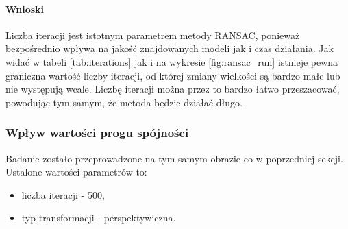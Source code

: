 \documentclass{article}
\begin{document}
	\paragraph{Wnioski}
	Liczba iteracji jest istotnym parametrem metody RANSAC, ponieważ bezpośrednio wpływa na jakość znajdowanych modeli jak i czas działania. Jak widać w tabeli \ref{tab:iterations} jak i na wykresie \ref{fig:ransac_run} istnieje pewna graniczna wartość liczby iteracji, od której zmiany wielkości są bardzo małe lub nie występują wcale. Liczbę iteracji można przez to bardzo łatwo przeszacować, powodując tym samym, że metoda będzie działać długo.

	\subsubsection{Wpływ wartości progu spójności}
	Badanie zostało przeprowadzone na tym samym obrazie co w poprzedniej sekcji. Ustalone wartości parametrów to:
	\begin{itemize}
		\item liczba iteracji - 500,
		\item typ transformacji - perspektywiczna.
	\end{itemize}
\end{document}
